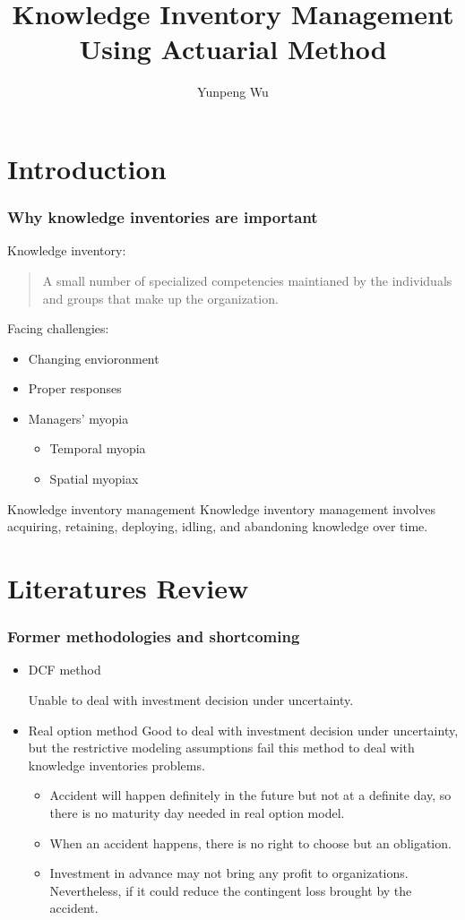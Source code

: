\documentclass[slidestop,compress,mathserif,table]{beamer}
\begin{document}
\title{Knowledge Inventory Management Using Actuarial Method}
    \author{Yunpeng Wu}
    \begin{frame}
      \titlepage
    \end{frame}

\section{Introduction}

\begin{frame}
  \frametitle{Why knowledge inventories are important}
Knowledge inventory:
\begin{quote}
 A small number of specialized competencies maintianed by the
 individuals and groups that make up the organization.
\end{quote}
Facing challengies:
\begin{itemize}
   \item Changing envioronment
     \item Proper responses
       \item Managers' myopia
         \begin{itemize}
         \item Temporal myopia
           \item Spatial myopiax
         \end{itemize}
\end{itemize}
\begin{block}{Knowledge inventory management}
 Knowledge inventory management involves acquiring, retaining, deploying, idling, and abandoning knowledge over time.
\end{block}
\end{frame}


\section{Literatures Review}
\begin{frame}
\frametitle{Former methodologies and shortcoming}
\begin{itemize}
\item DCF method

Unable to deal with investment decision under uncertainty.
\item Real option method
  Good to deal with investment decision under uncertainty, but the
  restrictive modeling assumptions fail this method to deal with
  knowledge inventories problems.
  \begin{itemize}
  \item  Accident will happen definitely in the future but not at a
      definite day, so there is no maturity day needed in real option
      model.
      \item When an accident happens, there is no right to choose but
        an obligation.
        \item Investment in advance may not bring any profit to organizations. Nevertheless, if it could reduce the contingent loss brought by the accident.
  \end{itemize}
\end{itemize}
\end{frame}
\end{document}
